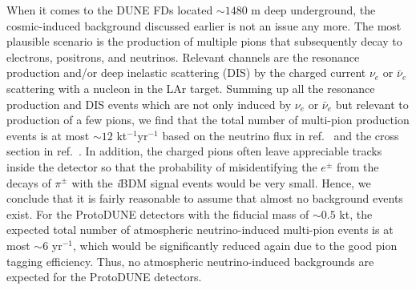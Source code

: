 When it comes to the DUNE FDs located $\sim 1480$ m deep underground, the cosmic-induced background discussed earlier is not an issue any more. 
The most plausible scenario is the production of multiple pions that subsequently decay to electrons, positrons, and neutrinos. 
Relevant channels are the resonance production and/or deep inelastic scattering (DIS) by the charged current $\nu_e$ or $\bar \nu_e$ scattering with a nucleon in the LAr target.
Summing up all the resonance production and DIS events which are not only induced by $\nu_e$ or $\bar \nu_e$ 
but relevant to production of a few pions, we find that the total number of multi-pion production events is at most $\sim 12$ kt$^{-1}$yr$^{-1}$ based on the neutrino flux in ref.~\cite{Honda:2015fha} and the cross section in ref.~\cite{Formaggio:2013kya}.
In addition, the charged pions often leave appreciable tracks inside the detector so that the probability of misidentifying the $e^\pm$ from the decays of $\pi^\pm$ with the {\it i}BDM signal events would be very small.
Hence, we conclude that it is fairly reasonable to assume that almost no background events exist.
For the ProtoDUNE detectors with the fiducial mass of $\sim0.5$ kt, the expected total number of atmospheric neutrino-induced multi-pion events is at most $\sim 6$ yr$^{-1}$, which would be significantly reduced again due to the good pion tagging efficiency. 
Thus, no atmospheric neutrino-induced backgrounds are expected for the ProtoDUNE detectors.  




